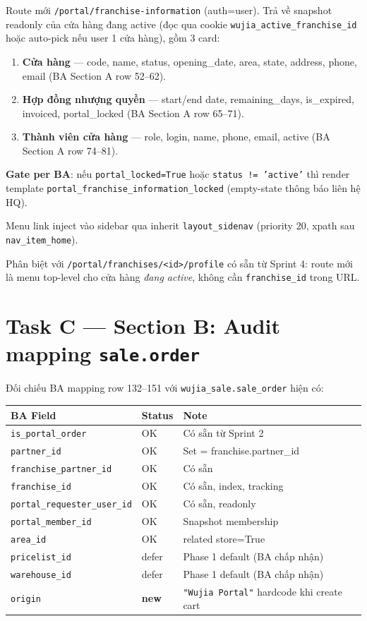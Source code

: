 Route mới \texttt{/portal/franchise-information} (auth=user). Trả về snapshot
readonly của cửa hàng đang active (đọc qua cookie \texttt{wujia\_active\_franchise\_id}
hoặc auto-pick nếu user 1 cửa hàng), gồm 3 card:

\begin{enumerate}[leftmargin=*]
    \item \textbf{Cửa hàng} --- code, name, status, opening\_date, area, state, address, phone, email (BA Section A row 52--62).
    \item \textbf{Hợp đồng nhượng quyền} --- start/end date, remaining\_days, is\_expired, invoiced, portal\_locked (BA Section A row 65--71).
    \item \textbf{Thành viên cửa hàng} --- role, login, name, phone, email, active (BA Section A row 74--81).
\end{enumerate}

\textbf{Gate per BA}: nếu \texttt{portal\_locked=True} hoặc \texttt{status != 'active'} thì render
template \texttt{portal\_franchise\_information\_locked} (empty-state thông báo
liên hệ HQ).

Menu link inject vào sidebar qua inherit \texttt{layout\_sidenav}
(priority 20, xpath sau \texttt{nav\_item\_home}).

Phân biệt với \texttt{/portal/franchises/<id>/profile} có sẵn từ Sprint 4:
route mới là menu top-level cho cửa hàng \emph{đang active}, không cần
\texttt{franchise\_id} trong URL.

\section{Task C --- Section B: Audit mapping \texttt{sale.order}}

Đối chiếu BA mapping row 132--151 với \texttt{wujia\_sale.sale\_order} hiện có:

\begin{tabular}{lll}
\toprule
\textbf{BA Field} & \textbf{Status} & \textbf{Note} \\
\midrule
\texttt{is\_portal\_order} & OK & Có sẵn từ Sprint 2 \\
\texttt{partner\_id} & OK & Set = franchise.partner\_id \\
\texttt{franchise\_partner\_id} & OK & Có sẵn \\
\texttt{franchise\_id} & OK & Có sẵn, index, tracking \\
\texttt{portal\_requester\_user\_id} & OK & Có sẵn, readonly \\
\texttt{portal\_member\_id} & OK & Snapshot membership \\
\texttt{area\_id} & OK & related store=True \\
\texttt{pricelist\_id} & defer & Phase 1 default (BA chấp nhận) \\
\texttt{warehouse\_id} & defer & Phase 1 default (BA chấp nhận) \\
\texttt{origin} & \textbf{new} & \texttt{"Wujia Portal"} hardcode khi create cart \\
\bottomrule
\end{tabular}

